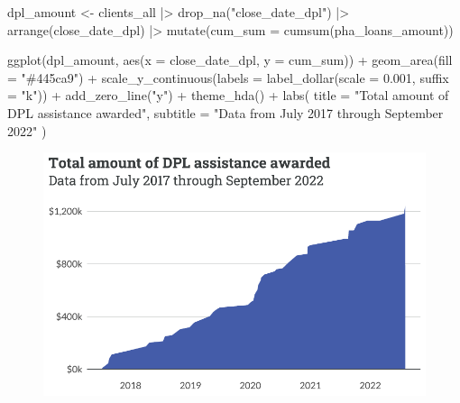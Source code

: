 \documentclass[
  letterpaper,
  DIV=11,
  numbers=noendperiod]{scrartcl}
\newenvironment{Shaded}{\begin{snugshade}}{\end{snugshade}}
\newcommand{\AttributeTok}[1]{\textcolor[rgb]{0.40,0.45,0.13}{#1}}
\newcommand{\FloatTok}[1]{\textcolor[rgb]{0.68,0.00,0.00}{#1}}
\newcommand{\FunctionTok}[1]{\textcolor[rgb]{0.28,0.35,0.67}{#1}}
\newcommand{\NormalTok}[1]{\textcolor[rgb]{0.00,0.23,0.31}{#1}}
\newcommand{\OtherTok}[1]{\textcolor[rgb]{0.00,0.23,0.31}{#1}}
\newcommand{\SpecialCharTok}[1]{\textcolor[rgb]{0.37,0.37,0.37}{#1}}
\newcommand{\StringTok}[1]{\textcolor[rgb]{0.13,0.47,0.30}{#1}}
\begin{document}
\begin{Shaded}
\begin{Highlighting}[]
\NormalTok{dpl\_amount }\OtherTok{\textless{}{-}}\NormalTok{ clients\_all }\SpecialCharTok{|\textgreater{}} 
  \FunctionTok{drop\_na}\NormalTok{(}\StringTok{"close\_date\_dpl"}\NormalTok{) }\SpecialCharTok{|\textgreater{}} 
  \FunctionTok{arrange}\NormalTok{(close\_date\_dpl) }\SpecialCharTok{|\textgreater{}} 
  \FunctionTok{mutate}\NormalTok{(}\AttributeTok{cum\_sum =} \FunctionTok{cumsum}\NormalTok{(pha\_loans\_amount))}

\FunctionTok{ggplot}\NormalTok{(dpl\_amount, }\FunctionTok{aes}\NormalTok{(}\AttributeTok{x =}\NormalTok{ close\_date\_dpl, }\AttributeTok{y =}\NormalTok{ cum\_sum)) }\SpecialCharTok{+}
  \FunctionTok{geom\_area}\NormalTok{(}\AttributeTok{fill =} \StringTok{"\#445ca9"}\NormalTok{) }\SpecialCharTok{+}
  \FunctionTok{scale\_y\_continuous}\NormalTok{(}\AttributeTok{labels =} \FunctionTok{label\_dollar}\NormalTok{(}\AttributeTok{scale =} \FloatTok{0.001}\NormalTok{, }\AttributeTok{suffix =} \StringTok{"k"}\NormalTok{)) }\SpecialCharTok{+}
  \FunctionTok{add\_zero\_line}\NormalTok{(}\StringTok{"y"}\NormalTok{) }\SpecialCharTok{+}
  \FunctionTok{theme\_hda}\NormalTok{() }\SpecialCharTok{+}
  \FunctionTok{labs}\NormalTok{(}
    \AttributeTok{title =} \StringTok{"Total amount of DPL assistance awarded"}\NormalTok{,}
    \AttributeTok{subtitle =} \StringTok{"Data from July 2017 through September 2022"}
\NormalTok{  )}
\end{Highlighting}
\end{Shaded}

\begin{figure}[H]

{\centering \includegraphics{piedmont_files/figure-pdf/dpl-amount-1.pdf}

}

\end{figure}
\end{document}
